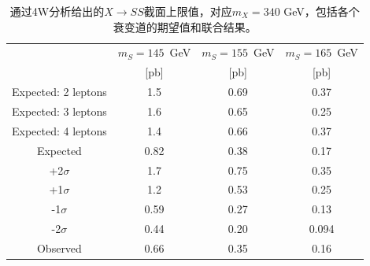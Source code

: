 \begin{table}[h]
\scriptsize
  \centering
  \begin{tabular}{cccc} 
    \hline
    & \multicolumn{1}{c}{$m_{S} = 145$~GeV} & \multicolumn{1}{c}{$m_{S} = 155$~GeV} & \multicolumn{1}{c}{$m_{S} = 165$~GeV} \\
        &  [pb] &  [pb] &  [pb]  \\
    \hline
    \hline
    Expected: 2 leptons & 1.5 & 0.69 & 0.37 \\
    \hline
    Expected: 3 leptons & 1.6 & 0.65 & 0.25 \\
    \hline
    Expected: 4 leptons & 1.4 & 0.66 & 0.37 \\
    \hline
    \hline
    Expected & 0.82 & 0.38 & 0.17 \\
    \hline
    +2$\sigma$ & 1.7 & 0.75 & 0.35 \\
    \hline
    +1$\sigma$ & 1.2 & 0.53 & 0.25 \\
    \hline
    -1$\sigma$ & 0.59 & 0.27 & 0.13 \\
    \hline
    -2$\sigma$ & 0.44 & 0.20 & 0.094 \\
    \hline
    \hline
    Observed & 0.66 & 0.35 & 0.16 \\
    \hline
  \end{tabular}
 \caption{通过4W分析给出的$X\rightarrow SS$截面上限值，对应$m_X=340$ GeV，包括各个衰变道的期望值和联合结果。}
  \label{tab:limit-comb-SS-mX}
\end{table}

